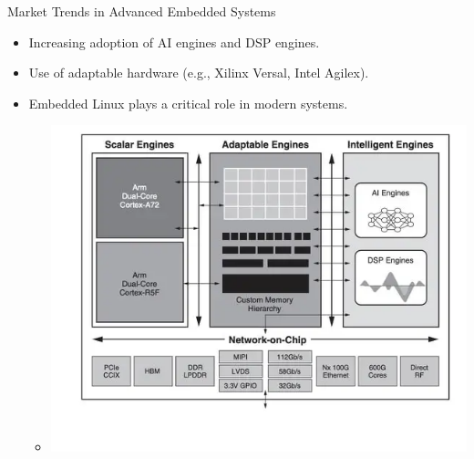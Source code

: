 \begin{frame}{Market Trends in Advanced Embedded Systems}
  \begin{itemize}
    \item Increasing adoption of AI engines and DSP engines.
    \item Use of adaptable hardware (e.g., Xilinx Versal, Intel Agilex).
    \item Embedded Linux plays a critical role in modern systems.
    \begin{itemize}
        \item \centering \includegraphics[scale=0.5]{trainingmaterials/rpibasics/xilinxacap.png}
    \end{itemize}
  \end{itemize}
\end{frame}

